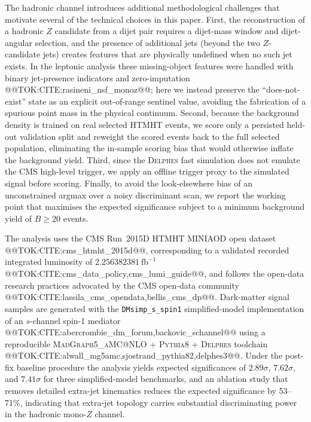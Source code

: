 \documentclass[11pt]{article}
\newcommand{\invfb}{\ensuremath{\mathrm{fb}^{-1}}}
\begin{document}
The hadronic channel introduces additional methodological challenges that
motivate several of the technical choices in this paper. First, the
reconstruction of a hadronic $Z$ candidate from a dijet pair requires a
dijet-mass window and dijet-angular selection, and the presence of additional
jets (beyond the two $Z$-candidate jets) creates features that are
physically undefined when no such jet exists. In the leptonic analysis these
missing-object features were handled with binary jet-presence indicators and
zero-imputation @@TOK:CITE:rasineni_nsf_monoz@@; here we instead preserve the
``does-not-exist'' state as an explicit out-of-range sentinel value, avoiding
the fabrication of a spurious point mass in the physical continuum. Second,
because the background density is trained on real selected HTMHT events, we
score only a persisted held-out validation split and reweight the scored
events back to the full selected population, eliminating the in-sample
scoring bias that would otherwise inflate the background yield. Third, since
the \textsc{Delphes} fast simulation does not emulate the CMS high-level
trigger, we apply an offline trigger proxy to the simulated signal before
scoring. Finally, to avoid the look-elsewhere bias of an unconstrained
argmax over a noisy discriminant scan, we report the working point that
maximises the expected significance subject to a minimum background yield of
$B\geq20$ events.

The analysis uses the CMS Run~2015D HTMHT MINIAOD open dataset
@@TOK:CITE:cms_htmht_2015d@@, corresponding to a validated recorded integrated
luminosity of $2.256382381~\invfb$ @@TOK:CITE:cms_data_policy,cms_lumi_guide@@,
and follows the open-data research practices advocated by the CMS open-data
community @@TOK:CITE:lassila_cms_opendata,bellis_cms_dp@@. Dark-matter signal
samples are generated with the \texttt{DMsimp\_s\_spin1} simplified-model
implementation of an $s$-channel spin-1 mediator
@@TOK:CITE:abercrombie_dm_forum,backovic_schannel@@ using a reproducible
\textsc{MadGraph5\_aMC@NLO} + \textsc{Pythia8} + \textsc{Delphes} toolchain
@@TOK:CITE:alwall_mg5amc,sjostrand_pythia82,delphes3@@. Under the post-fix
baseline procedure the analysis yields expected significances of
$2.89\sigma$, $7.62\sigma$, and $7.41\sigma$ for three simplified-model
benchmarks, and an ablation study that removes detailed extra-jet kinematics
reduces the expected significance by 53--71\%, indicating that extra-jet
topology carries substantial discriminating power in the hadronic mono-$Z$
channel.
\end{document}
